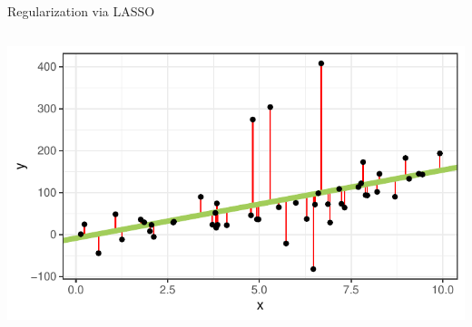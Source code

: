 \documentclass[11pt,compress,t,notes=noshow, aspectratio=169, xcolor=table]{beamer}
\begin{document}
\begin{frame}{Regularization via LASSO }
\begin{columns}[T, totalwidth=\linewidth]
\begin{column}{0.4\textwidth}
\centerline{\includegraphics[width=.8\textwidth]{figure/lm_example}} 
\end{column}
\end{columns}

\end{frame}
\end{document}
